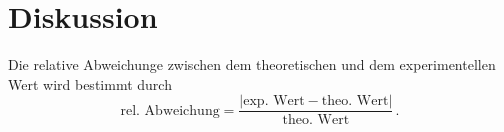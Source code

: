 \section{Diskussion}
\label{sec:Diskussion}
Die relative Abweichunge zwischen dem theoretischen und dem experimentellen Wert wird bestimmt durch
$$\text{rel. Abweichung} = \frac{|\text{exp. Wert} - \text{theo. Wert}|}{\text{theo. Wert}}\,.$$
